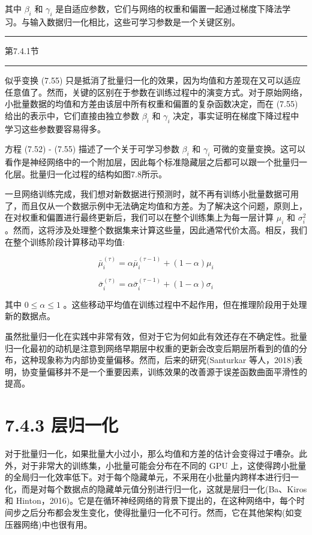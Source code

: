 \documentclass[10pt]{report}
\newcommand{\HRule}{\begin{center}\rule{0.9\linewidth}{0.2mm}\end{center}}
\begin{document}
其中 \({\beta }_{i}\) 和 \({\gamma }_{i}\) 是自适应参数，它们与网络的权重和偏置一起通过梯度下降法学习。与输入数据归一化相比，这些可学习参数是一个关键区别。

\HRule

第7.4.1节

\HRule

似乎变换 (7.55) 只是抵消了批量归一化的效果，因为均值和方差现在又可以适应任意值了。然而，关键的区别在于参数在训练过程中的演变方式。对于原始网络，小批量数据的均值和方差由该层中所有权重和偏置的复杂函数决定，而在 (7.55) 给出的表示中，它们直接由独立参数 \({\beta }_{i}\) 和 \({\gamma }_{i}\) 决定，事实证明在梯度下降过程中学习这些参数要容易得多。

方程 (7.52) - (7.55) 描述了一个关于可学习参数 \({\beta }_{i}\) 和 \({\gamma }_{i}\) 可微的变量变换。这可以看作是神经网络中的一个附加层，因此每个标准隐藏层之后都可以跟一个批量归一化层。批量归一化过程的结构如图7.8所示。

一旦网络训练完成，我们想对新数据进行预测时，就不再有训练小批量数据可用了，而且仅从一个数据示例中无法确定均值和方差。为了解决这个问题，原则上，在对权重和偏置进行最终更新后，我们可以在整个训练集上为每一层计算 \({\mu }_{i}\) 和 \({\sigma }_{i}^{2}\) 。然而，这将涉及处理整个数据集来计算这些量，因此通常代价太高。相反，我们在整个训练阶段计算移动平均值:

\[
{\bar{\mu }}_{i}^{\left( \tau \right) } = \alpha {\bar{\mu }}_{i}^{\left( \tau  - 1\right) } + \left( {1 - \alpha }\right) {\mu }_{i} \tag{7.56}
\]

\[
{\bar{\sigma }}_{i}^{\left( \tau \right) } = \alpha {\bar{\sigma }}_{i}^{\left( \tau  - 1\right) } + \left( {1 - \alpha }\right) {\sigma }_{i} \tag{7.57}
\]

其中 \(0 \leq  \alpha  \leq  1\) 。这些移动平均值在训练过程中不起作用，但在推理阶段用于处理新的数据点。

虽然批量归一化在实践中非常有效，但对于它为何如此有效还存在不确定性。批量归一化最初的动机是注意到网络早期层中权重的更新会改变后期层所看到的值的分布，这种现象称为内部协变量偏移。然而，后来的研究(Santurkar 等人，2018)表明，协变量偏移并不是一个重要因素，训练效果的改善源于误差函数曲面平滑性的提高。

\section*{7.4.3 层归一化}

对于批量归一化，如果批量大小过小，那么均值和方差的估计会变得过于嘈杂。此外，对于非常大的训练集，小批量可能会分布在不同的 GPU 上，这使得跨小批量的全局归一化效率低下。对于每个隐藏单元，不采用在小批量内跨样本进行归一化，而是对每个数据点的隐藏单元值分别进行归一化，这就是层归一化(Ba、Kiros 和 Hinton，2016)。它是在循环神经网络的背景下提出的，在这种网络中，每个时间步之后分布都会发生变化，使得批量归一化不可行。然而，它在其他架构(如变压器网络)中也很有用。
\end{document}
